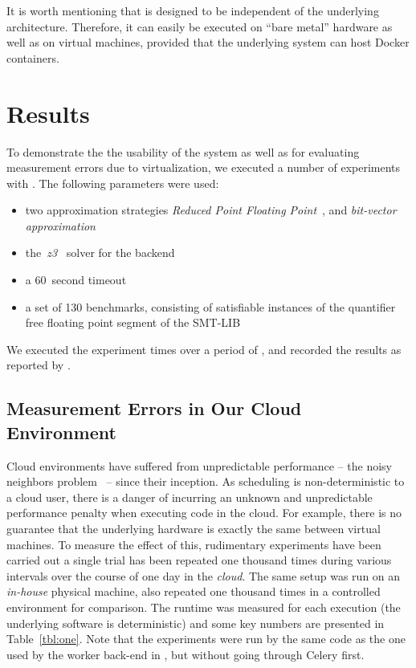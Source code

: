 \documentclass[a4paper]{IEEEtran}
\begin{document}
It is worth mentioning that \testbench{} is designed to be independent of the
underlying architecture. Therefore, it can easily be executed on ``bare metal''
hardware as well as on virtual machines, provided that the underlying system can
host Docker containers.

\section{Results}
To demonstrate the the usability of the system as well as for evaluating
measurement errors due to virtualization, we executed a number of experiments
with \testbench{}. The following parameters were used:
\begin{itemize}
\item two approximation strategies \emph{Reduced Point
  Floating Point}~\cite{uppsat}, and \emph{bit-vector
  approximation}~\cite{joel}

\item the~\emph{z3}~\cite{z3} solver for the backend

\item a 60~second timeout

\item a set of 130 benchmarks, consisting of satisfiable instances of the
  quantifier free floating point segment of the SMT-LIB~\cite{smtlib}
\end{itemize}
We executed the experiment  times over a period of
, and recorded the results as reported by \testbench{}.


\subsection{Measurement Errors in Our Cloud Environment}
Cloud environments have suffered from unpredictable performance -- the noisy
neighbors problem~\cite{williamson} -- since their inception. As scheduling is
non-deterministic to a cloud user, there is a danger of incurring an unknown and
unpredictable performance penalty when executing code in the cloud. For example,
there is no guarantee that the underlying hardware is exactly the same between
virtual machines. To measure the effect of this, rudimentary experiments have
been carried out a single trial has been repeated one thousand times during
various intervals over the course of one day in the \emph{cloud}. The same setup
was run on an \emph{in-house} physical machine, also repeated one thousand times
in a controlled environment for comparison. The runtime was measured for each
execution (the underlying software is deterministic) and some key numbers are
presented in Table~\ref{tbl:one}. Note that the experiments were run by the same
code as the one used by the worker back-end in \testbench{}, but without going
through Celery first.
\end{document}
